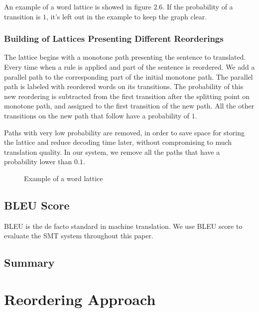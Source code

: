 An example of a word lattice is showed in figure $2.6$. If the probability of a transition is $1$, it's left out in the example to keep the graph clear.

\subsection{Building of Lattices Presenting Different Reorderings}

The lattice begins with a monotone path presenting the sentence to translated. Every time when a rule is applied and part of the sentence is reordered. We add a parallel path to the corresponding part of the initial monotone path. The parallel path is labeled with reordered words on its transitions. The probability of this new reordering is subtracted from the first transition after the splitting point on monotone path, and assigned to the first transition of the new path. All the other transitions on the new path that follow have a probability of $1$.


Paths with very low probability are removed, in order to save space for storing the lattice and reduce decoding time later, without compromising to much translation quality. In our system, we remove all the paths that have a probability lower than $0.1$.



\begin{landscape}
\begin{figure}
\centering

\caption{Example of a word lattice}
\end{figure}
\end{landscape}

\section{BLEU Score}
\label{ch:Foundations:sec:bleu}
BLEU is the de facto standard in machine translation\cite{metrics}. We use BLEU score to evaluate the SMT system throughout this paper.


\section{Summary}

\chapter{Reordering Approach}
\label{ch:ReorderingApproach}

